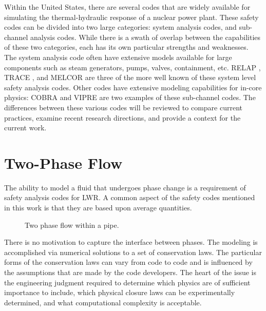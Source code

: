 Within the United States, there are several codes that are widely available for simulating the thermal-hydraulic response of a nuclear power plant.
These safety codes can be divided into two large categories: system analysis codes, and sub-channel analysis codes.
While there is a swath of overlap between the capabilities of these two categories, each has its own particular strengths and weaknesses.
The system analysis code often have extensive models available for large components such as steam generators, pumps, valves, containment, etc.
RELAP \cite{RELAP}, TRACE \cite{TRACE}, and MELCOR \cite{Summers1994} are three of the more well known of these system level safety analysis codes.
Other codes have extensive modeling capabilities for in-core physics: COBRA \cite{Thurgood1983c} and VIPRE are two examples of these sub-channel codes.
The differences between these various codes will be reviewed to compare current practices, examine recent research directions, and provide a context for the current work.

\section{Two-Phase Flow}
\label{sect:two_phase_flow}
The ability to model a fluid that undergoes phase change is a requirement of safety analysis codes for LWR.
A common aspect of the safety codes mentioned in this work is that they are based upon average quantities.

\begin{figure}[ht]
\caption{Two phase flow within a pipe.}
\label{fig:pipe_with_bubbles}
\begin{center}
\end{center}
\end{figure}

There is no motivation to capture the interface between phases.
The modeling is accomplished via numerical solutions to a set of conservation laws.
The particular forms of the conservation laws can vary from code to code and is influenced by the assumptions that are made by the code developers.
The heart of the issue is the engineering judgment required to determine which physics are of sufficient importance to include, which physical closure laws can be experimentally determined, and what computational complexity is acceptable.

